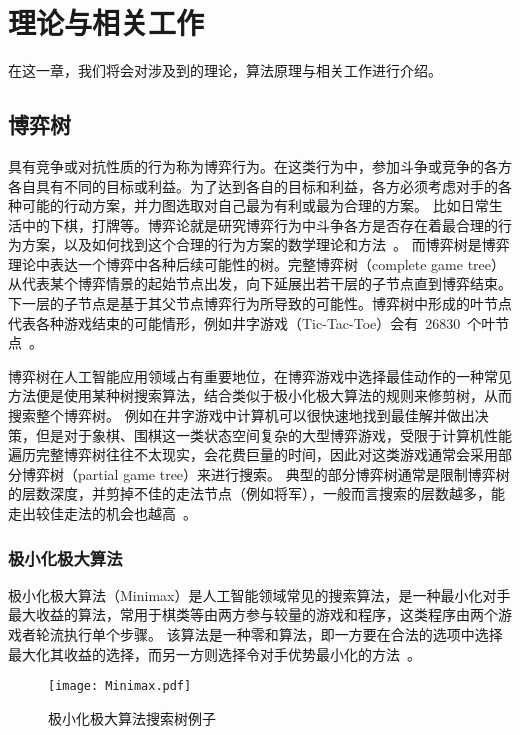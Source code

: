 \chapter{理论与相关工作}
\label{chap:theory}
在这一章，我们将会对涉及到的理论，算法原理与相关工作进行介绍。
\section{博弈树}
具有竞争或对抗性质的行为称为博弈行为。在这类行为中，参加斗争或竞争的各方各自具有不同的目标或利益。为了达到各自的目标和利益，各方必须考虑对手的各种可能的行动方案，并力图选取对自己最为有利或最为合理的方案。
比如日常生活中的下棋，打牌等。博弈论就是研究博弈行为中斗争各方是否存在着最合理的行为方案，以及如何找到这个合理的行为方案的数学理论和方法~\cite{gt}。
而博弈树是博弈理论中表达一个博弈中各种后续可能性的树。完整博弈树（complete game tree）从代表某个博弈情景的起始节点出发，向下延展出若干层的子节点直到博弈结束。
下一层的子节点是基于其父节点博弈行为所导致的可能性。博弈树中形成的叶节点代表各种游戏结束的可能情形，例如井字游戏（Tic-Tac-Toe）会有~26830~个叶节点~\cite{NAU1982257,allis1994searching}。


博弈树在人工智能应用领域占有重要地位，在博弈游戏中选择最佳动作的一种常见方法便是使用某种树搜索算法，结合类似于极小化极大算法的规则来修剪树，从而搜索整个博弈树。
例如在井字游戏中计算机可以很快速地找到最佳解并做出决策，但是对于象棋、围棋这一类状态空间复杂的大型博弈游戏，受限于计算机性能遍历完整博弈树往往不太现实，会花费巨量的时间，因此对这类游戏通常会采用部分博弈树（partial game tree）来进行搜索。
典型的部分博弈树通常是限制博弈树的层数深度，并剪掉不佳的走法节点（例如将军），一般而言搜索的层数越多，能走出较佳走法的机会也越高~\cite{coin12162}。

\subsection{极小化极大算法}
极小化极大算法（Minimax）是人工智能领域常见的搜索算法，是一种最小化对手最大收益的算法，常用于棋类等由两方参与较量的游戏和程序，这类程序由两个游戏者轮流执行单个步骤。
该算法是一种零和算法，即一方要在合法的选项中选择最大化其收益的选择，而另一方则选择令对手优势最小化的方法~\cite{ctt1r2gkx}。

\begin{figure}[htb]
    \centering
    \texttt{[image: Minimax.pdf]}
    \caption[minimax]{%
      极小化极大算法搜索树例子~\cite{wikiMinimax}%
      }
    \label{fig:minimax}
  \end{figure}

